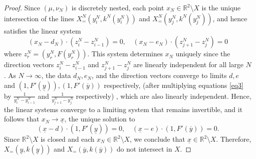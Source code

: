 \documentclass[12pt,reqno]{amsart}
\begin{document}
\begin{proof}
Since $(\mu,\nu_N)$ is discretely nested, each point $ x_N \in \mathbb{R}^2 \setminus X $ is the unique intersection of the lines $ X_=^N(y_i^N, k^N(y_i^N)) $ and $ X_=^N(y_j^N, k^N(y_j^N)) $, and hence satisfies the linear system
\begin{equation}\label{eq3}
(x_N - d_N) \cdot (z_i^N - z_{i-1}^N) = 0, \quad (x_N - e_N) \cdot (z_{j+1}^N - z_j^N) = 0
\end{equation}
where $z_r^N=(y_r^N,F(y_r^N))$. This system determines $ x_N $ uniquely since the direction vectors $ z_i^N - z_{i-1}^N $ and $ z_{j+1}^N - z_j^N $ are linearly independent for all large $ N $. As $ N \to \infty $, the data $ d_N, e_N $, and the direction vectors converge to limits $ d, e $ and $ (1, F'(\underline{y})), (1, F'(\overline{y})) $ respectively, (after multiplying equations \eqref{eq3}  by $\frac{1}{y_{i}^{N}-y_{i-1}^{N}}$ and $\frac{1}{y_{j+1}^{N}-y_{j}^{N}}$ respectively) , which are also linearly independent. Hence, the linear systems converge to a limiting system that remains invertible, and it follows that $ x_N \to \underline{x} $, the unique  solution to
\[
(\underline{x} - d) \cdot (1, F'(\underline{y})) = 0, \quad (\underline{x} - e) \cdot (1, F'(\overline{y})) = 0.
\]
Since $ \mathbb{R}^2 \setminus X $ is closed and each $ x_N \in \mathbb{R}^2 \setminus X $, we conclude that  $ \underline{x} \in \mathbb{R}^2 \setminus X $. Therefore,  $X_=(\underline{y},k(\underline{y}))$ and $X_=(\overline{y},k(\overline{y}))$ do not intersect in $X.$

 
\end{proof}
\end{document}
